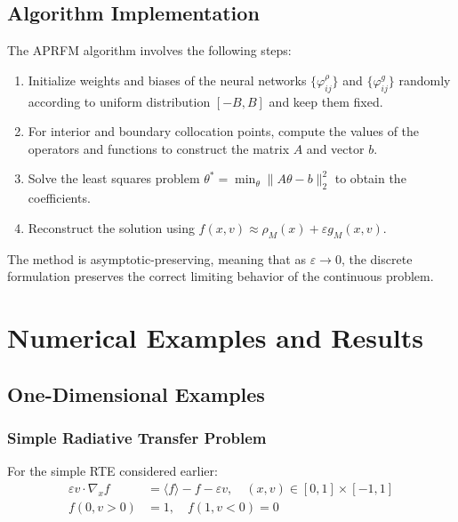 \documentclass[11pt]{article}
\begin{document}
\subsection{Algorithm Implementation}

The APRFM algorithm involves the following steps:

\begin{enumerate}
    \item Initialize weights and biases of the neural networks $\{\varphi_{ij}^\rho\}$ and $\{\varphi_{ij}^g\}$ randomly according to uniform distribution $[-B, B]$ and keep them fixed.
    
    \item For interior and boundary collocation points, compute the values of the operators and functions to construct the matrix $A$ and vector $b$.
    
    \item Solve the least squares problem $\theta^* = \min_{\theta} \|A\theta - b\|_2^2$ to obtain the coefficients.
    
    \item Reconstruct the solution using $f(x,v) \approx \rho_M(x) + \varepsilon g_M(x,v)$.
\end{enumerate}

The method is asymptotic-preserving, meaning that as $\varepsilon \to 0$, the discrete formulation preserves the correct limiting behavior of the continuous problem.

\section{Numerical Examples and Results}

\subsection{One-Dimensional Examples}

\subsubsection{Simple Radiative Transfer Problem}

For the simple RTE considered earlier:
\begin{align}
\varepsilon v \cdot \nabla_x f &= \langle f \rangle - f - \varepsilon v, \quad (x,v) \in [0,1] \times [-1,1]\\
f(0, v > 0) &= 1, \quad f(1, v < 0) = 0
\end{align}
\end{document}
